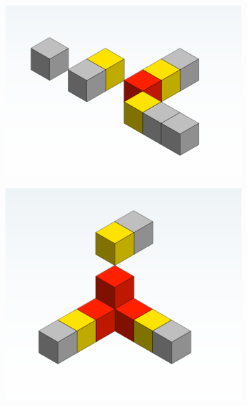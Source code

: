 \begin{figure}[!ht]
  \captionsetup[subfigure]{justification=centering}
  \centering
  \begin{subfigure}{0.32\textwidth}
    \centering
    \includegraphics[width=\textwidth]{Images/problem_skel0.png}
    \caption{}
  \end{subfigure}
  \begin{subfigure}{0.32\textwidth}
    \centering
    \includegraphics[width=\textwidth]{Images/problem_skel3.png}
    \caption{}
  \end{subfigure}
  \begin{subfigure}{0.32\textwidth}

\end{subfigure}
\end{figure}
